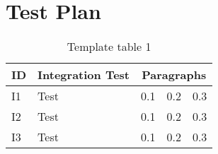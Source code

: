 
\chapter{Test Plan}
\blindtext

\begin{table}[h]
	\begin{tabularx}{\textwidth}{l | X | l l l}
		\textbf{ID} & \textbf{Integration Test} & \multicolumn{3}{c}{\textbf{Paragraphs}} \\ \hline
		I1	&	Test	&	0.1 & 0.2 & 0.3		\\	\hline
		I2	&	Test	&	0.1 & 0.2 & 0.3		\\	\hline
		I3	&	Test	&	0.1 & 0.2 & 0.3		\\
	\end{tabularx}
	\captionsetup{textformat=empty,labelformat=blank}
	\caption{Template table 1}
	\label{table:template-table-1}
\end{table}